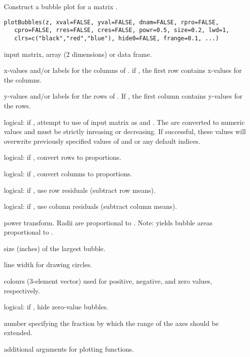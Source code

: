 \documentclass[letterpaper]{book}
\begin{document}
\begin{Description}\relax
Construct a bubble plot for a matrix .
\end{Description}
\begin{Usage}
\begin{verbatim}
plotBubbles(z, xval=FALSE, yval=FALSE, dnam=FALSE, rpro=FALSE, 
   cpro=FALSE, rres=FALSE, cres=FALSE, powr=0.5, size=0.2, lwd=1,
   clrs=c("black","red","blue"), hide0=FALSE, frange=0.1, ...) 
\end{verbatim}
\end{Usage}
\begin{Arguments}
\begin{ldescription}
\item[\code{z}] input matrix, array (2 dimensions) or data frame.
\item[\code{xval}] x-values and/or labels for the columns of . 
if , the first row contains x-values for the columns.
\item[\code{yval}] y-values and/or labels for the rows of . 
If , the first column contains y-values for the rows.
\item[\code{dnam}] logical: if , attempt to use  of input
matrix  as  and . The  are 
converted to numeric values and must be strictly inreasing or decreasing. 
If successful, these values will overwrite previously specified values
of  and  or any default indices.
\item[\code{rpro}] logical: if , convert rows to proportions.
\item[\code{cpro}] logical: if , convert columns to proportions.
\item[\code{rres}] logical: if , use row residuals (subtract row means).
\item[\code{cres}] logical: if , use column residuals (subtract column means).
\item[\code{powr}] power transform. Radii are proportional to . 
Note:  yields bubble areas proportional to .
\item[\code{size}] size (inches) of the largest bubble.
\item[\code{lwd}] line width for drawing circles.
\item[\code{clrs}] colours (3-element vector) used for positive, negative, 
and zero values, respectively.
\item[\code{hide0}] logical: if , hide zero-value bubbles.
\item[\code{frange}] number specifying the fraction by which the range of the axes should be extended.
\item[\code{...}] additional arguments for plotting functions.
\end{ldescription}
\end{Arguments}
\end{document}
